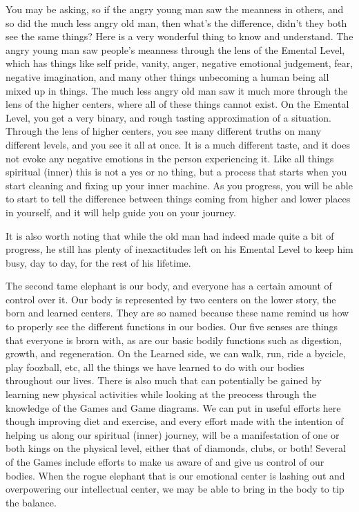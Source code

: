 \documentclass[12pt,letterpaper]{book}
\begin{document}
You may be asking, so if the angry young man saw the meanness in others, and so did the much less angry old man, then what's the difference, didn't they both see the same things? Here is a very wonderful thing to know and understand. The angry young man saw people's meanness through the lens of the Emental Level, which has things like self pride, vanity, anger, negative emotional judgement, fear, negative imagination, and many other things unbecoming a human being all mixed up in things. The much less angry old man saw  it much more through the lens of the higher centers, where all of these things cannot exist. On the Emental Level, you get a very binary, and rough tasting approximation of a situation. Through the lens of higher centers, you see many different truths on many different levels, and you see it all at once. It is a much different taste, and it does not evoke any negative emotions in the person experiencing it. Like all things spiritual (inner) this is not a yes or no thing, but a process that starts when you start cleaning and fixing up your inner machine. As you progress, you will be able to start to tell the difference between things coming from higher and lower places in yourself, and it will help guide you on your journey.

It is also worth noting that while the old man had indeed made quite a bit of progress, he still has plenty of inexactitudes left on his Emental Level to keep him busy, day to day, for the rest of his lifetime.

The second tame elephant is our body, and everyone has a certain amount of control over it. Our body is represented by two centers on the lower story, the born and learned centers. They are so named because these name remind us how to properly see the different functions in our bodies. Our five senses are things that everyone is brorn with, as are our basic bodily functions such as digestion, growth, and regeneration. On the Learned side, we can walk, run, ride a bycicle, play foozball, etc, all the things we have learned to do with our bodies throughout our lives. There is also much that can potentially be gained by learning new physical activities while looking at the preocess through the knowledge of the Games and Game diagrams. We can put in useful efforts here though improving diet and exercise, and every effort made with the intention of helping us along our spiritual (inner) journey, will be a manifestation of one or both kings on the physical level, either that of diamonds, clubs, or both! Several of the Games include efforts to make us aware of and give us control of our bodies. When the rogue elephant that is our emotional center is lashing out and overpowering our intellectual center, we may be able to bring in the body to tip the balance.  
\end{document}
